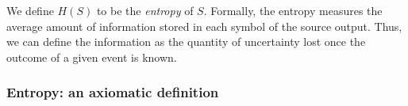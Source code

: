 \documentclass{subfiles}
\begin{document}
    We define \(H(S)\) to be the \emph{entropy} of \(S\). 
    Formally, the entropy measures the average amount of information stored 
        in each symbol of the source output.
        Thus, we can define the information as the quantity of uncertainty lost
        once the outcome of a given event is known.

    \subsubsection{Entropy: an axiomatic definition}\label{Sec:1.1.1}
    
\end{document}
